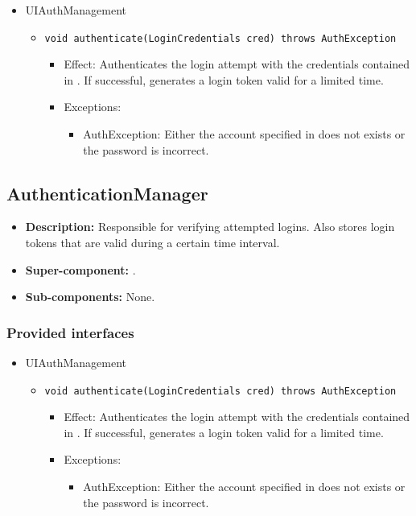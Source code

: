 \begin{itemize}
    \item UIAuthManagement
    \begin{itemize}
        \item \texttt{void authenticate(LoginCredentials cred) throws AuthException}
        \begin{itemize}
            \item Effect: Authenticates the login attempt with the credentials contained in . If successful, generates a login token valid for a limited time.
            \item Exceptions:
			\begin{itemize}
				\item AuthException: Either the account specified in  does not exists or the password is incorrect.
			\end{itemize}
        \end{itemize}
    \end{itemize}
\end{itemize}

\subsection{AuthenticationManager}
\begin{itemize}
    \item \textbf{Description:} Responsible for verifying attempted logins. Also stores login tokens that are valid during a certain time interval.
    \item \textbf{Super-component:} .
    \item \textbf{Sub-components:} None.
\end{itemize}

\subsubsection*{Provided interfaces}
\begin{itemize}
    \item UIAuthManagement
    \begin{itemize}
        \item \texttt{void authenticate(LoginCredentials cred) throws AuthException}
        \begin{itemize}
            \item Effect: Authenticates the login attempt with the credentials contained in . If successful, generates a login token valid for a limited time.
            \item Exceptions:
			\begin{itemize}
				\item AuthException: Either the account specified in  does not exists or the password is incorrect.
			\end{itemize}
        \end{itemize}
    \end{itemize}
\end{itemize}

